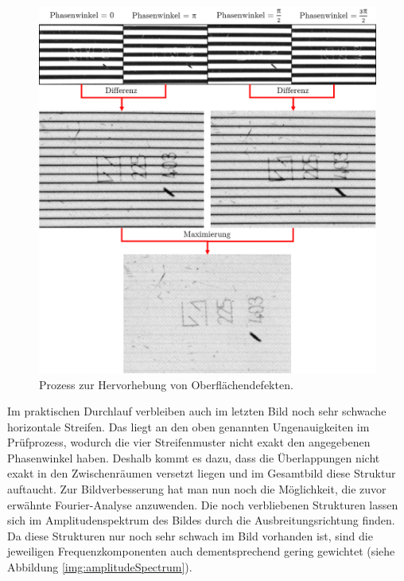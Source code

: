 \begin{figure}[H]
	\centering
	\includegraphics[width=\textwidth]{03_sichtpruefungDurchLichtreflexionen/optimierungen/figures/imageTree}
	\caption[Prozess der Hervorhebung von Oberflächendefekten]{Prozess zur Hervorhebung von Oberflächendefekten.}
	\label{img:imageTree}
\end{figure}

\noindent
Im praktischen Durchlauf verbleiben auch im letzten Bild noch sehr schwache horizontale Streifen.
Das liegt an den oben genannten Ungenauigkeiten im Prüfprozess, wodurch die vier Streifenmuster nicht exakt den angegebenen Phasenwinkel haben.
Deshalb kommt es dazu, dass die Überlappungen nicht exakt in den Zwischenräumen versetzt liegen und im Gesamtbild diese Struktur auftaucht.
Zur Bildverbesserung hat man nun noch die Möglichkeit, die zuvor erwähnte Fourier-Analyse anzuwenden.
Die noch verbliebenen Strukturen lassen sich im Amplitudenspektrum des Bildes durch die Ausbreitungsrichtung finden.
Da diese Strukturen nur noch sehr schwach im Bild vorhanden ist, sind die jeweiligen Frequenzkomponenten auch dementsprechend gering gewichtet (siehe Abbildung \ref{img:amplitudeSpectrum}).

